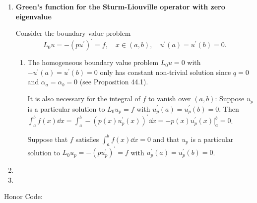 \documentclass[11pt]{article}
\begin{document}
\begin{enumerate}[label=\textbf{\arabic*.}]
    \item \textbf{Green's function for the Sturm-Liouville operator with zero eigenvalue}
    
    Consider the boundary value problem \[L_0u = -(pu^\prime)^\prime = f,\quad x\in(a,b),\quad u^\prime(a) = u^\prime(b) = 0.\]
    \begin{enumerate}[label=\textsf{(\roman*)}]
        \item The homogeneous boundary value problem $L_0u = 0$ with $-u^\prime(a) = u^\prime(b) = 0$ only has constant non-trivial solution since $q = 0$ and $\alpha_a = \alpha_b = 0$ (see Proposition 44.1).
        
        It is also necessary for the integral of $f$ to vanish over $(a,b)$: Suppose $u_p$ is a particular solution to $L_0u_p = f$ with $u_p^\prime(a) = u_p^\prime(b) = 0$. Then $\int_a^b f(x) \dd x = \int_a^b -(p(x)u^\prime_p(x))^\prime\dd x = -p(x)u^\prime_p(x)\big|_a^b = 0$.

        Suppose that $f$ satisfies $\int_a^b f(x)\dd x = 0$ and that $u_p$ is a particular solution to $L_0u_p = -(pu^\prime_p)^\prime = f$ with $u_p^\prime(a) = u_p^\prime(b) = 0$.
    \end{enumerate}
    
    \hrulefill
    \item 

    \hrulefill
    \item 

    \hrulefill
\end{enumerate}
Honor Code: \vspace*{7em}
\end{document}
